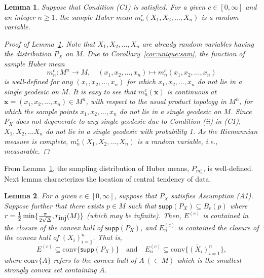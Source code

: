 \documentclass[preprint]{imsart}
\theoremstyle{plain}
\newtheorem{lemma}{Lemma}
\theoremstyle{remark}
\begin{document}
\begin{appendix}
\begin{lemma}\label{lem:sam:meas}
Suppose that Condition (C1) is satisfied. For a given $c \in [0, \infty]$ and an integer $n \ge 1$, the sample Huber mean $m^{c}_{n}(X_{1}, X_{2}, \ldots, X_{n})$ is a random variable.
\begin{proof}[Proof of Lemma~\ref{lem:sam:meas}]
Note that $X_{1}, X_{2}, ..., X_{n}$ are already random variables having the distribution $P_{X}$ on $M$. Due to Corollary~\ref{cor:unique:sam}, the function of sample Huber mean 
$$m^{c}_{n}:M^{n} \to M, \quad (x_{1}, x_{2}, \ldots, x_{n}) \mapsto m^{c}_{n}(x_{1}, x_{2}, \ldots, x_{n})$$
is well-defined for any $(x_{1}, x_{2}, \ldots, x_{n})$ for which $x_{1}, x_{2}, \ldots, x_{n}$ do not lie in a single geodesic on $M$. It is easy to see that $m^{c}_{n}(\mathbf{x})$ is continuous at $\mathbf{x} = (x_{1}, x_{2}, \ldots, x_{n}) \in M^{n}$, with respect to the usual product topology in $M^{n}$, for which the sample points $x_{1}, x_{2}, \ldots, x_{n}$ do not lie in a single geodesic on $M$. Since $P_{X}$ does not degenerate to any single geodesic due to Condition (ii) in (C1), $X_{1}, X_{2}, ... X_{n}$ do not lie in a single geodesic with probability 1. As the Riemannian measure is complete, $m^{c}_{n}(X_{1}, X_{2}, \ldots, X_{n})$ is a random variable, i.e., measurable.
\end{proof}
\end{lemma}

From Lemma~\ref{lem:sam:meas}, the sampling distribution of Huber means, $P_{m^{c}_{n}}$, is well-defined. Next lemma characterizes the location of central tendency of data.

\begin{lemma}\label{lem:conv}
For a given $c \in [0, \infty]$, suppose that $P_{X}$ satisfies Assumption (A1). Suppose further that there exists $p \in M$ such that $\textsf{supp}(P_{X}) \subseteq B_{r}(p)$ where $r = \frac{1}{2}\min\{\frac{\pi}{2\sqrt{\Delta}}, r_{\mbox{\tiny inj}}(M)\}$ (which may be infinite). Then, $E^{(c)}$ is contained in the closure of the convex hull of $\textsf{supp}(P_{X})$, and $E^{(c)}_{n}$ is contained the closure of the convex hull of $(X_{i})_{i=1}^{n}$. That is, 
$$
E^{(c)} \subseteq \overline{\mbox{conv}\{\textsf{supp}(P_{X})\}} \quad \mbox{and}\quad E_{n}^{(c)} \subseteq \overline{\mbox{conv}\{(X_{i})_{i=1}^{n}\}},
$$
where $\mbox{conv}\{A\}$ refers to the convex hull of $A ~ (\subset M)$ which is the smallest strongly convex set containing $A$.
\end{lemma}



\end{appendix}
\end{document}
